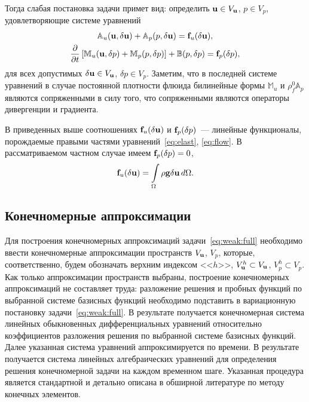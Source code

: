 Тогда слабая постановка задачи примет вид:
определить $\mathbf{u}\in V_{\mathbf{u}}$, $p\in V_p$, удовлетворяющие системе уравнений
%
\begin{equation}\label{eq:weak:full}
\begin{gathered}
     \mathbb{A}_u(\vc{u}, \delta{\vc{u}})   +  \mathbb{A}_p(p, \delta{\vc{u}})  = \vc{f}_u(\delta\vc{u}),\\
%
     \dudx{}{t}\left[\mathbb{M}_u(\vc{u},\delta p) + \mathbb{M}_p(p,\delta p)\right] +  \mathbb{B}(p,\delta p) = \vc{f}_p(\delta p),
%
\end{gathered}
\end{equation}
%
для всех допустимых $\delta\mathbf{u}\in V_{\mathbf{u}}$, $\delta p\in V_p$.
Заметим, что в последней системе уравнений в случае постоянной плотности флюида билинейные 
формы $\mathbb{M}_u$ и $\rho_f^0\mathbb{A}_p$ являются сопряженными
в силу того, что  сопряженными являются 
операторы дивергенции и градиента.

В приведенных выше соотношениях $\mathbf{f}_u(\delta\mathbf{u})$ и
$\mathbf{f}_p(\delta p)$~--- линейные функционалы, порождаемые правыми
частями уравнений~\eqref{eq:elast}, \eqref{eq:flow}. В рассматриваемом
частном случае имеем $\mathbf{f}_p(\delta p) = 0$,
%
\[
\mathbf{f}_u(\delta\mathbf{u}) = 
\int\limits_\Omega\rho\mathbf{g}\delta\mathbf{u}\, d\Omega.
\]




\subsection{Конечномерные аппроксимации}

Для построения конечномерных аппроксимаций задачи~\eqref{eq:weak:full}
необходимо ввести конечномерные аппроксимации пространств
$V_{\mathbf{u}}$, $V_p$, которые, соответственно,
будем обозначать верхним индексом <<$h$>>,
%
$V^h_{\mathbf{u}}\subset V_{\mathbf{u}}$, $V_p^h\subset V_p$.
%
Как только аппроксимации пространств выбраны, построение конечномерных аппроксимаций
не составляет труда: разложение решения и пробных функций по выбранной системе базисных
функций необходимо подставить в вариационную постановку
задачи~\eqref{eq:weak:full}. В результате получается конечномерная
система линейных обыкновенных дифференциальных уравнений относительно коэффициентов
разложения решения по выбранной системе базисных функций. Далее
указанная система уравнений аппроксимируется по времени. В результате
получается
система линейных алгебраических уравнений для определения решения
конечномерной задачи на каждом временном шаге. Указанная процедура
является стандартной и детально описана в обширной литературе по
методу конечных элементов.

